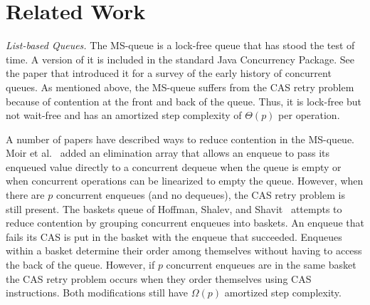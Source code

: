 
\section{Related Work}

\emph{List-based Queues.}
The MS-queue \cite{MS98} is a lock-free queue that has stood the test of time.
A version of it is
included in the standard Java Concurrency Package.  %
See the paper that introduced it for a survey of the early history of concurrent queues.
As mentioned above, the MS-queue suffers from the CAS retry problem because of contention at the front and back of the queue.
Thus, it is lock-free but not wait-free and has an amortized
step complexity of $\Theta(p)$ per operation.

A number of papers have described ways to reduce contention in the MS-queue.
Moir et al.~\cite{DBLP:conf/spaa/MoirNSS05} 
added an elimination array that allows an enqueue to pass its enqueued value directly
to a concurrent dequeue when the queue is empty or when concurrent operations 
can be linearized to empty the queue.
However, when there are $p$ concurrent enqueues (and no dequeues), the CAS retry problem
is still present.
The baskets queue of
Hoffman, Shalev, and Shavit~\cite{DBLP:conf/opodis/HoffmanSS07} 
attempts to reduce contention by grouping concurrent enqueues into baskets.
An enqueue that fails its CAS is put in the basket with the enqueue that succeeded.
Enqueues within a basket determine their order among themselves without having to access the back of the queue.
However, if $p$ concurrent enqueues are in the same basket
the CAS retry problem occurs when they order themselves using CAS instructions.
Both modifications still have $\Omega(p)$ amortized step complexity.

